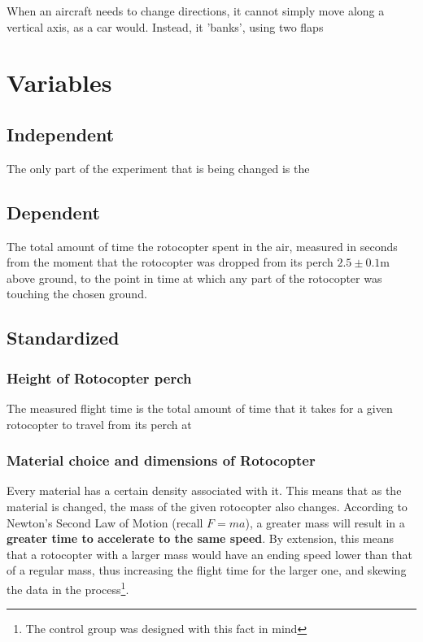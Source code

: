 \documentclass[]{article}
\begin{document}
When an aircraft needs to change directions, it cannot simply move along a vertical axis, as a car would. Instead, it 'banks', using two flaps 

\section{Variables}

\label{independent}
\subsection{Independent}
The only part of the experiment that is being changed is the 

\subsection{Dependent}
The total amount of time the rotocopter spent in the air, measured in seconds from the moment that the rotocopter was dropped from its perch $2.5 \pm 0.1$m above ground, to the point in time at which any part of the rotocopter was touching the chosen ground.

\subsection{Standardized}

\subsubsection{Height of Rotocopter perch}
The measured flight time is the total amount of time that it takes for a given rotocopter to travel from its perch at 

\subsubsection{Material choice and dimensions of Rotocopter}
Every material has a certain density associated with it. This means that as the material is changed, the mass of the given rotocopter also changes. According to Newton's Second Law of Motion (recall $F=ma$), a greater mass will result in a \textbf{greater time to accelerate to the same speed}. By extension, this means that a rotocopter with a larger mass would have an ending speed lower than that of a regular mass, thus increasing the flight time for the larger one, and skewing the data in the process\footnote{The control group was designed with this fact in mind}.
\end{document}
